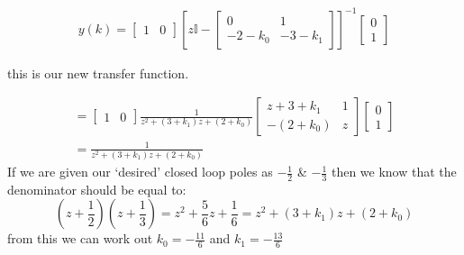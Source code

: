 \documentclass[a4paper,11pt]{article}
\begin{document}
	\begin{gather}
		y(k)=
		\begin{bmatrix}
			1 & 0 
		\end{bmatrix}
		[z\mathbb{I}-
		\begin{bmatrix}
		0&1\\
		-2-k_0& -3-k_1
		\end{bmatrix}
		]^{-1}
		\begin{bmatrix}
			0\\1
		\end{bmatrix}
	\end{gather}

	this is our new transfer function.


	\begin{gather}
		=
		\begin{bmatrix}
			1 & 0 
		\end{bmatrix}
		\frac{1}{z^2+(3+k_1)z+(2+k_0)}
		\begin{bmatrix}
		z+3+k_1&1\\
		-(2+k_0)  & z
		\end{bmatrix}
		\begin{bmatrix}
			0\\1
		\end{bmatrix}\\
		= \frac{1}{z^2+(3+k_1)z+(2+k_0)}
	\end{gather}
	If we are given our `desired' closed loop poles as $-\frac{1}{2}$  \&  $-\frac{1}{3}$ then we know that the denominator should be equal to:
	\begin{equation}
	 (z+\frac{1}{2})(z+\frac{1}{3}) = z^2+\frac{5}{6}z+\frac{1}{6} = z^2+(3+k_1)z+(2+k_0)
	 \end{equation}
	 from this we can work out $k_0 = -\frac{11}{6}$ and $k_1 = -\frac{13}{6}$ \\
\end{document}
